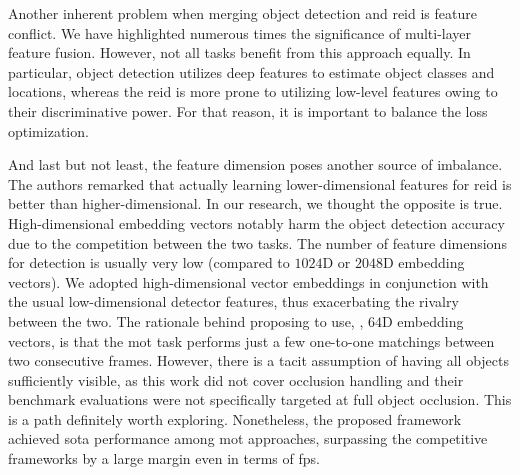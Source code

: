 Another inherent problem when merging object detection and \gls{reid} is feature conflict. We have highlighted numerous times the significance of multi-layer feature fusion. However, not all tasks benefit from this approach equally. In particular, object detection utilizes deep features to estimate object classes and locations, whereas the \gls{reid} is more prone to utilizing low-level features owing to their discriminative power. For that reason, it is important to balance the loss optimization.

And last but not least, the feature dimension poses another source of imbalance. The authors remarked that actually learning lower-dimensional features for \gls{reid} is better than higher-dimensional. In our research, we thought the opposite is true. High-dimensional embedding vectors notably harm the object detection accuracy due to the competition between the two tasks. The number of feature dimensions for detection is usually very low (compared to $1024$D or $2048$D embedding vectors). We adopted high-dimensional vector embeddings in conjunction with the usual low-dimensional detector features, thus exacerbating the rivalry between the two. The rationale behind proposing to use, \egtext{}, $64$D embedding vectors, is that the \gls{mot} task performs just a few one-to-one matchings between two consecutive frames. However, there is a tacit assumption of having all objects sufficiently visible, as this work did not cover occlusion handling and their benchmark evaluations were not specifically targeted at full object occlusion. This is a path definitely worth exploring. Nonetheless, the proposed framework achieved \gls{sota} performance among \gls{mot} approaches, surpassing the competitive frameworks by a large margin even in terms of \gls{fps}.
